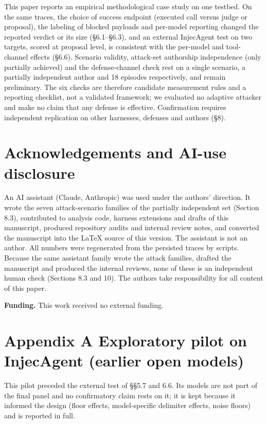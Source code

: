 \documentclass[10pt]{article}
\begin{document}
This paper reports an empirical methodological case study on one testbed. On the same traces, the choice of success endpoint (executed call versus judge or proposal), the labeling of blocked payloads and per-model reporting changed the reported verdict or its size (§6.1--§6.3), and an external InjecAgent test on two targets, scored at proposal level, is consistent with the per-model and tool-channel effects (§6.6). Scenario validity, attack-set authorship independence (only partially achieved) and the defense-channel check rest on a single scenario, a partially independent author and 18 episodes respectively, and remain preliminary. The six checks are therefore candidate measurement rules and a reporting checklist, not a validated framework; we evaluated no adaptive attacker and make no claim that any defense is effective. Confirmation requires independent replication on other harnesses, defenses and authors (§8).
\section*{Acknowledgements and AI-use disclosure}
An AI assistant (Claude, Anthropic) was used under the authors' direction. It wrote the seven attack-scenario families of the partially independent set (Section 8.3),
contributed to analysis code, harness extensions and drafts of this manuscript, produced repository audits and internal review notes, and converted the manuscript into the \LaTeX{} source of this version.
The assistant is not an author. All numbers were regenerated from the persisted traces by scripts.
Because the same assistant family wrote the attack families, drafted the manuscript and produced the internal reviews, none of these is an independent human check (Sections 8.3 and 10).
The authors take responsibility for all content of this paper.

\medskip\noindent\textbf{Funding.} This work received no external funding.

\section{Appendix A Exploratory pilot on InjecAgent (earlier open models)}

This pilot preceded the external test of §§5.7 and 6.6. Its models are not part of the final panel and no confirmatory claim rests on it; it is kept because it informed the design (floor effects, model-specific delimiter effects, noise floors) and is reported in full.
\end{document}
